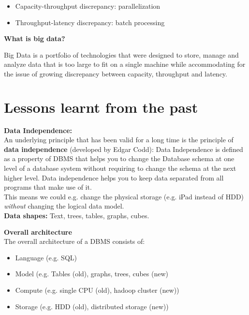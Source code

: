 \documentclass[11pt,oneside,a4paper]{article}
\begin{document}
\vspace{-\topsep}
\begin{itemize}
	\setlength{\itemsep}{0pt}
	\setlength{\parskip}{0pt}
	\item Capacity-throughput discrepancy: parallelization
	\item Throughput-latency discrepancy: batch processing
\end{itemize}
\vspace{-\topsep}

\textbf{What is big data?}

Big Data is a portfolio of technologies that were designed to store, manage and analyze data that is too large to fit on a single machine while accommodating for the issue of growing discrepancy between
capacity, throughput and latency.

\section{Lessons learnt from the past}

\textbf{Data Independence:}\\
An underlying principle that has been valid for a long time is the principle of \textbf{data independence} (developed by Edgar Codd): Data Independence is defined as a property of DBMS that helps you to change the Database schema at one level of a database system without requiring to change the schema at the next higher level. Data independence helps you to keep data separated from all programs that make use of it.\\
This means we could e.g. change the physical storage (e.g. iPad instead of HDD) \textit{without} changing the logical data model.\\

\textbf{Data shapes:} Text, trees, tables, graphs, cubes.

\textbf{Overall architecture}\\
The overall architecture of a DBMS consists of:

\vspace{-\topsep}
\begin{itemize}
	\setlength{\itemsep}{0pt}
	\setlength{\parskip}{0pt}
	\item Language (e.g. SQL)
	\item Model (e.g. Tables (old), graphs, trees, cubes (new)
	\item Compute (e.g. single CPU (old), hadoop cluster (new))
	\item Storage (e.g. HDD (old), distributed storage (new))
\end{itemize}
\vspace{-\topsep}
\end{document}

